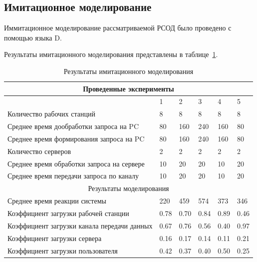 \documentclass[russian,utf8,emptystyle]{eskdtext}
\begin{document}
\subsection{Имитационное моделирование}

Иммитационное моделирование рассматриваемой РСОД было проведено с помощью языка D. 

Результаты имитационного моделирования представлены в таблице~\ref{tab:sim-result}.

\begin{longtable}{p{10cm}|p{1cm}|p{1cm}|p{1cm}|p{1cm}|p{1cm}}
\caption{Результаты имитационного моделирования}
\label{tab:sim-result} \\
\hline
\multicolumn{6}{c}{Проведенные эксперименты} \\ \hline
                                                    & 1      & 2      & 3      & 4      & 5       \\ \cline{2-6}
Количество рабочих станций                          & 8      & 8      & 8      & 8      & 8      \\
Среднее время дообработки запроса на PC             & 80     & 160    & 240    & 160    & 80     \\
Среднее время формирования запроса на PC            & 80     & 160    & 240    & 160    & 80     \\
Количество серверов                                 & 2      & 2      & 2      & 2      & 2      \\
Среднее время обработки запроса на сервере          & 10     & 20     & 20     & 10     & 20     \\
Среднее время передачи запроса по каналу            & 10     & 20     & 20     & 10     & 20     \\  
\hline
\multicolumn{6}{c}{Результаты моделирования} \\ 
\hline
Среднее время реакции системы                       & 220    & 459    & 574    & 373    & 346    \\
Коэффициент загрузки рабочей станции                & 0.78   & 0.70   & 0.84   & 0.89   & 0.46   \\
Коэффициент загрузки канала передачи данных         & 0.67   & 0.76   & 0.56   & 0.40   & 0.97   \\
Коэффициент загрузки сервера                        & 0.16   & 0.17   & 0.14   & 0.11   & 0.21   \\
Коэффициент загрузки пользователя                   & 0.42   & 0.37   & 0.40   & 0.50   & 0.25   \\
\end{longtable}
\end{document}
